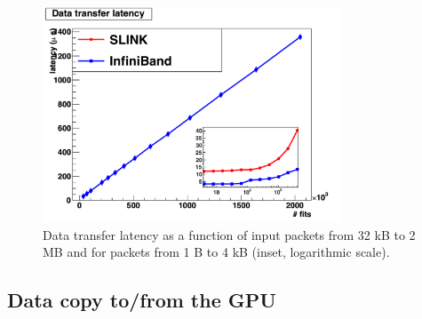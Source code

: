 \documentclass[journal]{IEEEtran}
\begin{document}
\begin{figure}[!t]
\centering
\includegraphics[width=3.5in]{figures/DT_SLINK_IB_inset}
\caption{Data transfer latency as a function of input packets from 32 kB to 
2 MB and for packets from 1 B to 4 kB (inset, logarithmic scale).}
\label{fig_DT_SLINK_IB}
\end{figure}

%
\subsection{Data copy to/from the GPU}
\end{document}
